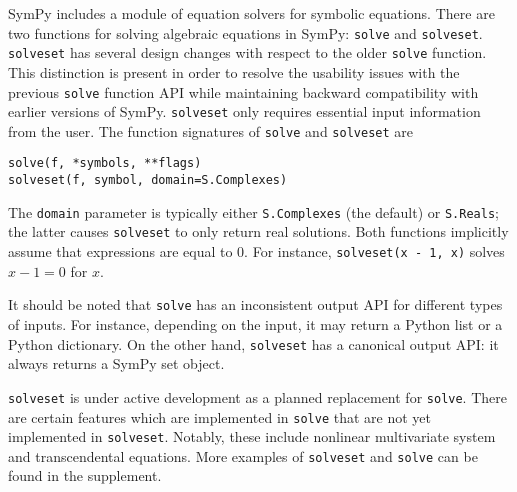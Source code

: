 SymPy includes a module of equation solvers for symbolic equations. There are two
functions for solving algebraic equations in SymPy: \texttt{solve}
and \texttt{solveset}.
\texttt{solveset} has several design changes with respect to the older
\texttt{solve} function. This distinction is present in order to resolve the
usability issues with the
previous \texttt{solve} function API while maintaining backward compatibility
with earlier versions of SymPy.
\texttt{solveset} only requires essential input information from the user.
The function signatures of \texttt{solve} and \texttt{solveset} are
\begin{verbatim}
solve(f, *symbols, **flags)
solveset(f, symbol, domain=S.Complexes)
\end{verbatim}
The \texttt{domain} parameter is typically either \texttt{S.Complexes} (the
default) or \texttt{S.Reals}; the latter causes \texttt{solveset} to only return real solutions.
Both functions implicitly assume that expressions are equal to 0. For
instance, \texttt{solveset(x - 1, x)} solves $x - 1 = 0$ for $x$.

It should be noted that \texttt{solve} has an inconsistent output API for different types
of inputs. For instance, depending on the input, it may return a Python
list or a Python dictionary. On the other hand,
\texttt{solveset} has a canonical output API: it always returns
a SymPy set object.

\texttt{solveset} is under active development as a planned replacement for
\texttt{solve}. There are certain features which are implemented in
\texttt{solve} that are not yet implemented in \texttt{solveset}. Notably,
these include nonlinear multivariate system and transcendental equations.
More examples of \texttt{solveset} and \texttt{solve} can be found in the
supplement.
